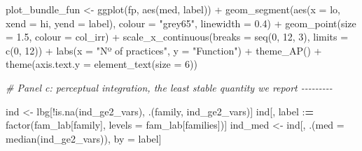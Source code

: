\documentclass[
  11pt,
]{article}
\newenvironment{Shaded}{\begin{snugshade}}{\end{snugshade}}
\newcommand{\AttributeTok}[1]{\textcolor[rgb]{0.77,0.63,0.00}{#1}}
\newcommand{\CommentTok}[1]{\textcolor[rgb]{0.56,0.35,0.01}{\textit{#1}}}
\newcommand{\DecValTok}[1]{\textcolor[rgb]{0.00,0.00,0.81}{#1}}
\newcommand{\ErrorTok}[1]{\textcolor[rgb]{0.64,0.00,0.00}{\textbf{#1}}}
\newcommand{\FloatTok}[1]{\textcolor[rgb]{0.00,0.00,0.81}{#1}}
\newcommand{\FunctionTok}[1]{\textcolor[rgb]{0.00,0.00,0.00}{#1}}
\newcommand{\NormalTok}[1]{#1}
\newcommand{\OtherTok}[1]{\textcolor[rgb]{0.56,0.35,0.01}{#1}}
\newcommand{\SpecialCharTok}[1]{\textcolor[rgb]{0.00,0.00,0.00}{#1}}
\newcommand{\StringTok}[1]{\textcolor[rgb]{0.31,0.60,0.02}{#1}}
\begin{document}
\begin{Shaded}
\begin{Highlighting}[]
\NormalTok{plot\_bundle\_fun }\OtherTok{\textless{}{-}} \FunctionTok{ggplot}\NormalTok{(fp, }\FunctionTok{aes}\NormalTok{(med, label)) }\SpecialCharTok{+}
  \FunctionTok{geom\_segment}\NormalTok{(}\FunctionTok{aes}\NormalTok{(}\AttributeTok{x =}\NormalTok{ lo, }\AttributeTok{xend =}\NormalTok{ hi, }\AttributeTok{yend =}\NormalTok{ label), }\AttributeTok{colour =} \StringTok{"grey65"}\NormalTok{,}
               \AttributeTok{linewidth =} \FloatTok{0.4}\NormalTok{) }\SpecialCharTok{+}
  \FunctionTok{geom\_point}\NormalTok{(}\AttributeTok{size =} \FloatTok{1.5}\NormalTok{, }\AttributeTok{colour =}\NormalTok{ col\_irr) }\SpecialCharTok{+}
  \FunctionTok{scale\_x\_continuous}\NormalTok{(}\AttributeTok{breaks =} \FunctionTok{seq}\NormalTok{(}\DecValTok{0}\NormalTok{, }\DecValTok{12}\NormalTok{, }\DecValTok{3}\NormalTok{), }\AttributeTok{limits =} \FunctionTok{c}\NormalTok{(}\DecValTok{0}\NormalTok{, }\DecValTok{12}\NormalTok{)) }\SpecialCharTok{+}
  \FunctionTok{labs}\NormalTok{(}\AttributeTok{x =} \StringTok{"Nº of practices"}\NormalTok{, }\AttributeTok{y =} \StringTok{"Function"}\NormalTok{) }\SpecialCharTok{+}
  \FunctionTok{theme\_AP}\NormalTok{() }\SpecialCharTok{+}
  \FunctionTok{theme}\NormalTok{(}\AttributeTok{axis.text.y =} \FunctionTok{element\_text}\NormalTok{(}\AttributeTok{size =} \DecValTok{6}\NormalTok{))}

\CommentTok{\# Panel c: perceptual integration, the least stable quantity we report {-}{-}{-}{-}{-}{-}{-}{-}{-}}

\NormalTok{ind }\OtherTok{\textless{}{-}}\NormalTok{ lbg[}\SpecialCharTok{!}\FunctionTok{is.na}\NormalTok{(ind\_ge2\_vars), .(family, ind\_ge2\_vars)]}
\NormalTok{ind[, label }\SpecialCharTok{:}\ErrorTok{=} \FunctionTok{factor}\NormalTok{(fam\_lab[family], }\AttributeTok{levels =}\NormalTok{ fam\_lab[families])]}
\NormalTok{ind\_med }\OtherTok{\textless{}{-}}\NormalTok{ ind[, .(}\AttributeTok{med =} \FunctionTok{median}\NormalTok{(ind\_ge2\_vars)), by }\OtherTok{=}\NormalTok{ label]}


\end{Highlighting}
\end{Shaded}
\end{document}
